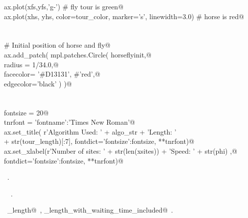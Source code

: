 \documentclass[11.5pt]{report}
\begin{document}
\begin{flushleft}
\begin{list}{}{}
\mbox{}\verb@    ax.plot(xfs,yfs,'g-') # fly tour is green@\\
\mbox{}\verb@    ax.plot(xhs, yhs, color=tour_color, marker='s', linewidth=3.0) # horse is red@\\
\mbox{}\verb@@\\
\mbox{}\verb@@\\
\mbox{}\verb@    # Initial position of horse and fly@\\
\mbox{}\verb@    ax.add_patch( mpl.patches.Circle( horseflyinit,@\\
\mbox{}\verb@                                      radius = 1/34.0,@\\
\mbox{}\verb@                                      facecolor= '#D13131', #'red',@\\
\mbox{}\verb@                                      edgecolor='black'   )  )@\\
\mbox{}\verb@@\\
\mbox{}\verb@@\\
\mbox{}\verb@    fontsize = 20@\\
\mbox{}\verb@    tnrfont = {'fontname':'Times New Roman'}@\\
\mbox{}\verb@    ax.set_title( r'Algorithm Used: ' + algo_str +  '\nTour Length: ' \@\\
\mbox{}\verb@                    + str(tour_length)[:7], fontdict={'fontsize':fontsize}, **tnrfont)@\\
\mbox{}\verb@    ax.set_xlabel(r'Number of sites: ' + str(len(xsites)) + '\nDrone Speed: ' + str(phi) ,@\\
\mbox{}\verb@                  fontdict={'fontsize':fontsize}, **tnrfont)@\\
\mbox{}\verb@@{\NWsep}
\end{list}
\vspace{-1.5ex}
\footnotesize
\begin{list}{}{\setlength{\itemsep}{-\parsep}\setlength{\itemindent}{-\leftmargin}}
\item \NWtxtMacroRefIn\ .
\item \NWtxtIdentsDefed\nobreak\  \verb@plotTour@\nobreak\ .\item \NWtxtIdentsUsed\nobreak\  \verb@tour_length@\nobreak\ , \verb@tour_length_with_waiting_time_included@\nobreak\ .
\item{}
\end{list}
\vspace{4ex}
\end{flushleft}
\end{document}
